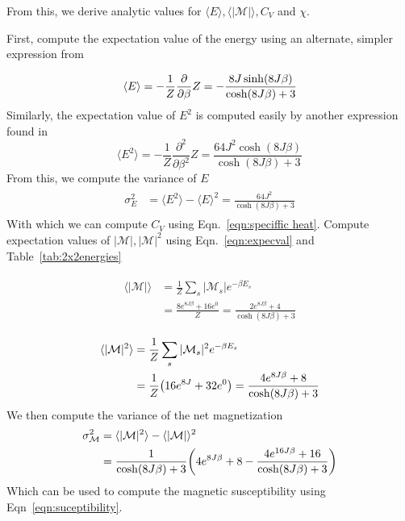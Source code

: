 \documentclass[10pt,showpacs,preprintnumbers,amsmath,amssymb,nofootinbib,aps,prl,twocolumn,groupedaddress,superscriptaddress,showkeys]{revtex4-1}
\begin{document}
    From this, we derive analytic values for $\langle E \rangle, \langle |\mathcal M| \rangle , C_V$ and $\chi$. 

    First, compute the expectation value of the energy using an alternate, simpler expression from \textcite[Ch~6.2]{schroeder}

    \begin{equation}
      \langle E \rangle = -\frac{1}{Z}\pderivative{\beta}Z = -\frac{8J\sinh(8J\beta)}{\cosh(8J\beta) + 3}
    \end{equation}
    Similarly, the expectation value of $E^2$ is computed easily by another expression found in \textcite[Ch~6.2]{schroeder}
    \begin{equation}
      \langle E^2 \rangle = -\frac{1}{Z}\frac{\partial^2}{\partial\beta^2}Z = \frac{64J^2 \cosh(8J\beta)}{\cosh(8J\beta) + 3}
    \end{equation}
    From this, we compute the variance of $E$
    \begin{align}
      \begin{split}
        \sigma_E^2 &= \langle E^2 \rangle - \langle E \rangle ^2 
        = \frac{64J^2}{\cosh(8J\beta) + 3}
      \end{split}
    \end{align}
    With which we can compute $C_V$ using Eqn.~\ref{eqn:speciffic heat}. Compute expectation values of $|\mathcal M|, |\mathcal M|^2$ using Eqn.~\ref{eqn:expecval} and Table~\ref{tab:2x2energies}

    \begin{align}
      \begin{split}
        \langle |\mathcal M | \rangle &= \frac{1}{Z} \sum_s |\mathcal M_s | e^{-\beta E_s} 
          \\
        &= \frac{8e^{8J\beta} + 16e^0}{Z} = \frac{2e^{8J\beta} + 4}{\cosh(8J\beta) + 3}
      \end{split}
    \end{align}

    \begin{align}
      \begin{split}
        \langle |\mathcal M |^2 \rangle &= \frac{1}{Z}\sum_s|\mathcal M_s|^2e^{-\beta E_s} 
          \\
        &= \frac{1}{Z}\qty(16e^{8J} + 32e^{0}) = \frac{4e^{8J\beta} + 8}{\cosh(8J\beta) + 3}
      \end{split}
    \end{align}
    We then compute the variance of the net magnetization
    \begin{align}
      \begin{split}
        \sigma_{\mathcal M}^2 &= \langle |\mathcal M|^2\rangle - \langle |\mathcal M|\rangle^2
          \\
        &= \frac{1}{\cosh(8J\beta) + 3}\qty(4e^{8J\beta} + 8 - \frac{4e^{16J\beta}+16}{\cosh(8J\beta) + 3})
      \end{split}
    \end{align}
    Which can be used to compute the magnetic susceptibility using Eqn~\ref{eqn:suceptibility}.
\end{document}
